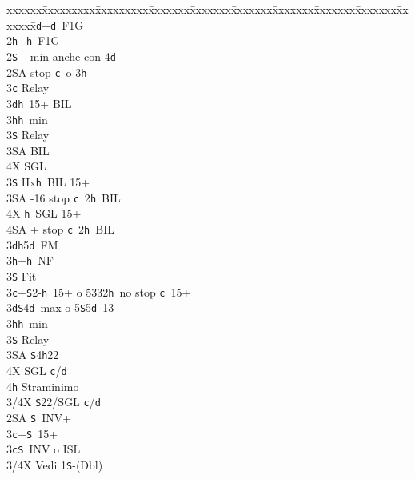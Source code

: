 \documentclass[a4paper,italian]{article}
\newcommand{\BS}{\small{\texttt{S}}}
\newcommand{\BC}{\small{\texttt{c}}}
\newcommand{\BD}{\small{\texttt{d}}}
\newcommand{\BH}{\small{\texttt{h}}}
\newenvironment{bidtable}
{\begin{tabbing}

    xxxxxx\=xxxxxxxxx\=xxxxxxxxx\=xxxxxxx\=xxxxxxx\=xxxxxxx\=xxxxxxx\=xxxxxxx\=xxxxxxx\=xxxxxxx\=\kill}
{\end{tabbing} }%
\begin{document}
\begin{multicols}{2}
\begin{bidtable}
        2\BD {}+\BD\ F1G\\
        2\BH {}+\BH\ F1G\+\\
        2\BS {}+ min anche con 4\BD \\
        2\small{SA}  stop \BC\ o 3\BH \+\\
        3\BC \> Relay\+\\
        3\BD {}\BH\ 15+ BIL\\
        3\BH {}\BH\ min\+\\
        3\BS \> Relay\+\\
        3\small{SA} \> BIL\\
        4X \> SGL\-\-\\
        3\BS \> Hx\BH\ BIL 15+\\
        3\small{SA} -16 stop \BC\ 2\BH\ BIL\\
        4X \BH\ SGL 15+\\
        4\small{SA} + stop \BC\ 2\BH\ BIL\-\\
        3\BD {}\BH 5\BD\ FM\\
        3\BH {}+\BH\ NF\\
        3\BS \> Fit\-\\
        3\BC {}+\BS2-\BH\ 15+ o 5332\BH\ no stop \BC\ 15+\\
        3\BD {}\BS 4\BD\ max o 5\BS 5\BD\ 13+\\
        3\BH {}\BH\ min\+\\
        3\BS \> Relay\+\\
        3\small{SA} \BS 4\BH 22\\
        4X \> SGL \BC /\BD \\
        4\BH \> Straminimo\-\-\\
        3/4X \BS 22/SGL \BC /\BD \-\\
        2\small{SA} \BS\ INV+\+\\
        3\BC {}+\BS\ 15+\-\\
        3\BC{}\BS\ INV o ISL\\
        3/4X \> Vedi 1\BS -(Dbl)\-
    \end{bidtable}
\vfill\null


\end{multicols}
\end{document}
